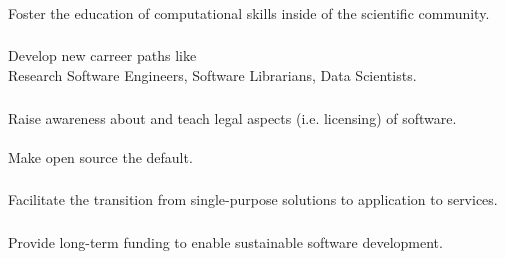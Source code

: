 \documentclass{beamer}
\begin{document}
\begin{frame}
  \frametitle{}
  \begin{block}{}
    \begin{center}
      Foster the education of computational skills inside of the
      scientific community.
    \end{center}
  \end{block}
\end{frame}

\begin{frame}
  \frametitle{}
  \begin{block}{}
    \begin{center}
      Develop new carreer paths like\\ Research Software Engineers,
      Software Librarians, Data Scientists.
    \end{center}
  \end{block}
\end{frame}

\begin{frame}
  \frametitle{}
  \begin{block}{}
    \begin{center}
      Raise awareness about and teach legal aspects (i.e. licensing) of
      software.\\\
      \pause
      \\Make open source the default.
    \end{center}
  \end{block}
\end{frame}

\begin{frame}
  \frametitle{}
  \begin{block}{}
    \begin{center}
       Facilitate the transition from single-purpose solutions to
       application to services.
    \end{center}
  \end{block}
\end{frame}

\begin{frame}
  \frametitle{}
  \begin{block}{}
    \begin{center}
      Provide long-term funding to enable sustainable software
      development.
    \end{center}
  \end{block}
\end{frame}
\end{document}
